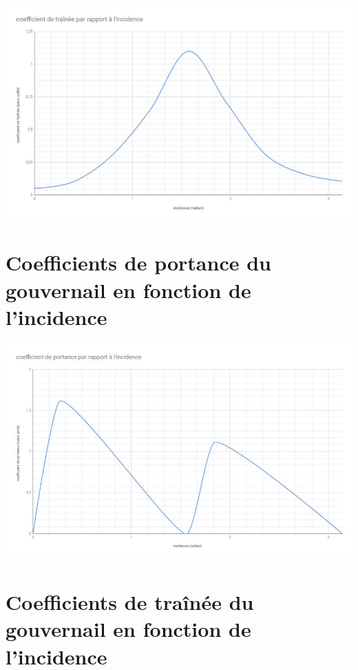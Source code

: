 \documentclass[a4paper,11pt]{article}
\begin{document}
\begin{appendix}
        \begin{center}
            \includegraphics[scale=0.7, angle=90]{assets/Titanic_Cx.jpg}
        \end{center}

        \section{Coefficients de portance du gouvernail en fonction de l'incidence}

        \begin{center}
            \includegraphics[scale=0.7, angle=90]{assets/Rudder_Cz.jpg}
        \end{center}


        \section{Coefficients de traînée du gouvernail en fonction de l'incidence}


\end{appendix}
\end{document}
